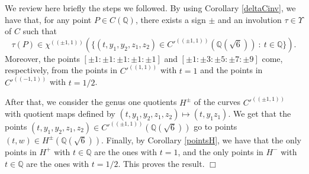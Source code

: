 \documentclass[a4paper,12pt]{amsart}
\theoremstyle{remark}
\theoremstyle{definition}
\newenvironment{pf}{\par\noindent{\bf Proof.}\enspace\ignorespaces}{{\hfill $\Box$}\par\par}
\begin{document}
\begin{pf}
We review here briefly the steps we followed. By using Corollary
\ref{deltaCinv}, we have that, for any point $P\in C({{\mathbb{Q}}})$, there
exists a sign $\pm$ and an involution $\tau \in \Upsilon$ of $C$
such that $$\tau(P) \in \chi^{((\pm1,1))}(\{(t,y_1,y_2,z_1,z_2)\in
C'^{((\pm1,1))}({{\mathbb{Q}}}(\sqrt{6}))\ : \ t\in {{\mathbb{Q}}}\}).$$ Moreover, the
points $[\pm1:\pm1:\pm1:\pm1:\pm1]$ and
$[\pm1:\pm3:\pm5:\pm7:\pm9]$ come, respectively, from the points
in $C'^{((1,1))}$ with $t=1$ and the points in $C'^{((-1,1))}$
with $t=1/2$.

After that, we consider the genus one quotients $H^{\pm}$ of the
curves $C'^{((\pm1,1))}$ with quotient maps defined by
$(t,y_1,y_2,z_1,z_2)\mapsto (t,y_1z_1)$. We get that the points
$(t,y_1,y_2,z_1,z_2)\in C'^{((\pm1,1))}({{\mathbb{Q}}}(\sqrt{6}))$ go to
points $(t,w)\in H^{\pm}({{\mathbb{Q}}}(\sqrt{6}))$. Finally, by Corollary
\ref{pointsH}, we have that the only points in $H^{+}$ with $t\in
{{\mathbb{Q}}}$ are the ones with $t=1$, and the only points in $H^{-}$ with
$t\in {{\mathbb{Q}}}$ are the ones with $t=1/2$. This proves the result.
\end{pf}

\
\end{document}
